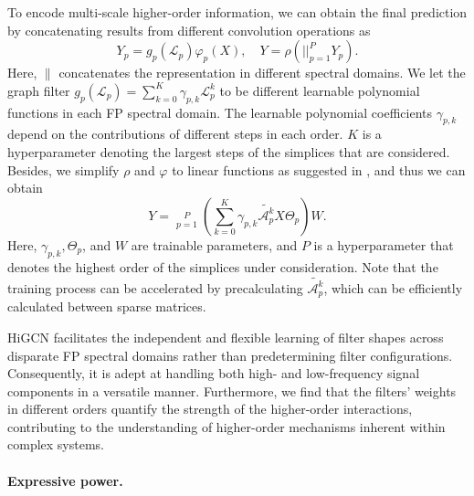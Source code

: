 \documentclass[letterpaper]{article} \usepackage{aaai24}
\theoremstyle{plain}
\theoremstyle{definition}
\theoremstyle{remark}
\begin{document}
 
To encode multi-scale higher-order information, we can obtain the final prediction
by concatenating results from different convolution operations as
\begin{equation}
\label{equ:general_HiSCN}
    Y_p = g_p(\mathcal{L}_p)\varphi_p(X),
    \quad
    Y = \rho \left( {\big|\!\big|}_{p=1}^P Y_p\right).
\end{equation}
Here, $\|$ concatenates the representation in different spectral domains. 
We let the graph filter $g_p(\mathcal{L}_p)=\sum_{k=0}^K \gamma_{p,k} \mathcal{L}_p^k$ to be different learnable polynomial functions in each FP spectral domain. 
The learnable polynomial coefficients $\gamma_{p,k}$ depend on the contributions of different steps in each order. 
$K$ is a hyperparameter denoting the largest steps of the simplices that are considered. 
Besides, we simplify $\rho$ and $\varphi$ to linear functions as suggested in \cite{LinearGNN}, and thus we can obtain
\begin{equation}
    Y =   \mathop{\big|\!\big|}\limits_{p=1}^P \left(\sum_{k=0}^K \gamma_{p,k} \tilde{\mathcal{A}_p^k} X \Theta_p \right) W.
\end{equation}
Here, $\gamma_{p,k}, \Theta_p $, and $W$ are trainable parameters, and $P$ is a hyperparameter that denotes the highest order of the simplices under consideration. 
Note that the training process can be accelerated by precalculating $\tilde{\mathcal{A}_p^k}$, which can be efficiently calculated between sparse matrices. 



HiGCN facilitates the independent and flexible learning of filter shapes across disparate FP spectral domains rather than predetermining filter configurations. 
Consequently, it is adept at handling both high- and low-frequency signal components in a versatile manner. 
Furthermore, we find that the filters' weights in different orders quantify the strength of the higher-order interactions, contributing to the understanding of higher-order mechanisms inherent within complex systems.







\paragraph{Expressive power.}
\end{document}
